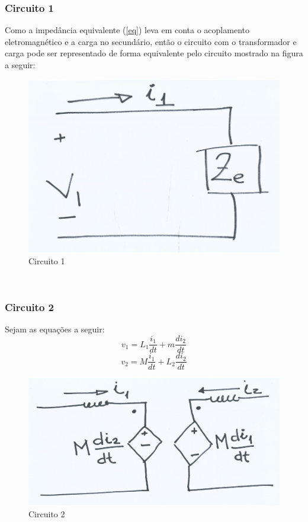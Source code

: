 \documentclass[a4paper, 12pt]{article}
\begin{document}
		\subsubsection{Circuito 1}
			Como a impedância equivalente (\ref{eq}) leva em conta o acoplamento eletromagnético e a carga no secundário, então o circuito com o transformador e carga pode ser representado de forma equivalente pelo circuito mostrado na figura a seguir:
			\begin{figure}[h]
				\centering
				\includegraphics[scale=0.4]{a14.png}
				\caption{Circuito 1}
			\end{figure}\\
		\subsubsection{Circuito 2}
			Sejam as equações a seguir:
			\begin{equation}
				v_1 = L_1 \frac{i_1}{dt} + m \frac{di_2}{dt}
			\end{equation}
			\begin{equation}
				v_2 = M \frac{i_1}{dt} + L_2 \frac{di_2}{dt}
			\end{equation}
			\begin{figure}[h]
				\centering
				\includegraphics[scale=0.4]{a15.png}
				\caption{Circuito 2}
			\end{figure}\\
\end{document}
